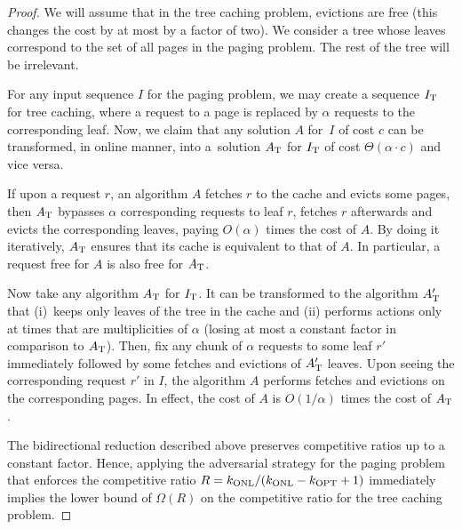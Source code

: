\begin{proof}
We will assume that in the tree caching problem, evictions are free (this
changes the cost by at most by a factor of two). We consider a tree whose
leaves correspond to the set of all pages in the paging problem. The rest of
the tree will be irrelevant.

For any input sequence $I$ for the paging problem, we may create a sequence
$I_\textnormal{T}$ for tree caching, where a request to a page is replaced by
$\alpha$ requests to the corresponding leaf. Now, we claim that any solution
$A$ for~$I$ of cost $c$ can be transformed, in online manner, into a~solution
$A_\textnormal{T}$ for $I_\textnormal{T}$ of cost $\Theta(\alpha \cdot c)$ and
vice versa.

If upon a request $r$, an algorithm $A$ fetches $r$ to the cache and evicts
some pages, then $A_\textnormal{T}$ bypasses $\alpha$ corresponding requests
to leaf $r$, fetches $r$ afterwards and evicts the corresponding leaves,
paying $O(\alpha)$ times the cost of $A$. By doing it iteratively,
$A_\textnormal{T}$ ensures that its cache is equivalent to that of $A$. In
particular, a request free for $A$ is also free for $A_\textnormal{T}$.

Now take any algorithm $A_\textnormal{T}$ for $I_\textnormal{T}$. It can be
transformed to the algorithm $A_\textnormal{T}'$ that (i)~keeps only leaves of
the tree in the cache and (ii) performs actions only at times that are
multiplicities of $\alpha$ (losing at most a constant factor in comparison to
$A_\textnormal{T}$). Then, fix any chunk of $\alpha$ requests to some leaf
$r'$ immediately followed by some fetches and evictions of $A_\textnormal{T}'$
leaves. Upon seeing the corresponding request $r'$ in $I$, the algorithm $A$
performs fetches and evictions on the corresponding pages. In effect, the cost
of $A$ is $O(1/\alpha)$ times the cost of $A_\textnormal{T}$.

The bidirectional reduction described above preserves competitive ratios up to
a constant factor. Hence, applying the adversarial strategy for the paging
problem that enforces the competitive ratio  $R = k_\textnormal{ONL}/(k_\textnormal{ONL}-k_\textnormal{OPT}+1)$
\cite{competitive-analysis} immediately implies the lower bound of $\Omega(R)$
on the competitive ratio for the tree caching problem.
\end{proof}

